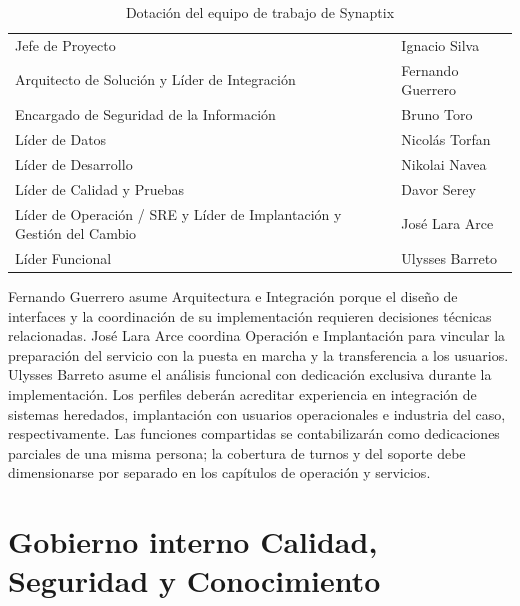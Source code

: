 \begin{table}[H]
  \caption{Dotación del equipo de trabajo de Synaptix}
  \label{tab:dotacion-synaptix}
  \begin{tabular}{L{\dimexpr.50\tabcolsep\relax}L{\dimexpr.50\tabcolsep\relax}}
    \hline
     &  \\
    \hline
    Jefe de Proyecto & Ignacio Silva \\
    \hline
    Arquitecto de Solución y Líder de Integración & Fernando Guerrero \\
    \hline
    Encargado de Seguridad de la Información & Bruno Toro \\
    \hline
    Líder de Datos & Nicolás Torfan \\
    \hline
    Líder de Desarrollo & Nikolai Navea \\
    \hline
    Líder de Calidad y Pruebas & Davor Serey \\
    \hline
    Líder de Operación / SRE y Líder de Implantación y Gestión del Cambio & José Lara Arce \\
    \hline
    Líder Funcional & Ulysses Barreto \\
    \hline
\end{tabular}
\end{table}

Fernando Guerrero asume Arquitectura e Integración porque el diseño de interfaces y la coordinación de su implementación requieren decisiones técnicas relacionadas. José Lara Arce coordina Operación e Implantación para vincular la preparación del servicio con la puesta en marcha y la transferencia a los usuarios. Ulysses Barreto asume el análisis funcional con dedicación exclusiva durante la implementación. Los perfiles deberán acreditar experiencia en integración de sistemas heredados, implantación con usuarios operacionales e industria del caso, respectivamente. Las funciones compartidas se contabilizarán como dedicaciones parciales de una misma persona; la cobertura de turnos y del soporte debe dimensionarse por separado en los capítulos de operación y servicios.



\section{Gobierno interno Calidad, Seguridad y Conocimiento}

